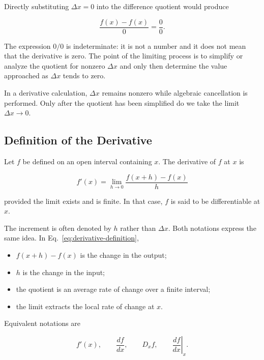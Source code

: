 Directly substituting $\Delta x=0$ into the difference quotient would produce

\[
\frac{f(x)-f(x)}{0}=\frac00.
\]

The expression $0/0$ is indeterminate: it is not a number and it does not mean that the derivative is zero. The point of the limiting process is to simplify or analyze the quotient for nonzero $\Delta x$ and only then determine the value approached as $\Delta x$ tends to zero.

\begin{bookwarning}
In a derivative calculation, $\Delta x$ remains nonzero while algebraic cancellation is performed. Only after the quotient has been simplified do we take the limit $\Delta x\to0$.
\end{bookwarning}

\subsection{Definition of the Derivative}

\begin{bookdefinition}
Let $f$ be defined on an open interval containing $x$. The derivative of $f$ at $x$ is

\begin{equation}
\boxed{
f'(x)
=
\lim_{h\to0}
\frac{f(x+h)-f(x)}{h}
}
\label{eq:derivative-definition}
\end{equation}

provided the limit exists and is finite. In that case, $f$ is said to be differentiable at $x$.
\end{bookdefinition}

The increment is often denoted by $h$ rather than $\Delta x$. Both notations express the same idea. In Eq.~\eqref{eq:derivative-definition},

\begin{itemize}
\item $f(x+h)-f(x)$ is the change in the output;
\item $h$ is the change in the input;
\item the quotient is an average rate of change over a finite interval;
\item the limit extracts the local rate of change at $x$.
\end{itemize}

Equivalent notations are

\[
f'(x),
\qquad
\frac{df}{dx},
\qquad
D_x f,
\qquad
\left.\frac{df}{dx}\right|_x.
\]

